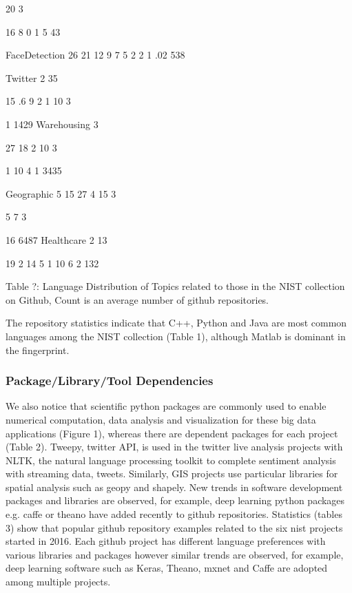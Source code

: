 \documentclass[9pt,twocolumn,twoside]{styles/osajnl}
\begin{document}
	20%
	3%

	16%
	8%
	0%
	1%
	5%
	43

	FaceDetection
	26%
	21%
	12%
	9%
	7%
	5%
	2%
	2%
	1%
	.02%
	538

	Twitter
	2%
	35%

	15%
	.6%
	9%
	2%
	1%
	10%
	3%

	1%
	1429
	Warehousing
	3%

	27%
	18%
	2%
	10%
	3%

	1%
	10%
	4%
	1%
	3435

	Geographic
	5%
	15%
	27%
	4%
	15%
	3%

	5%
	7%
	3%

	16%
	6487
	Healthcare
	2%
	13%

	19%
	2%
	14%
	5%
	1%
	10%
	6%
	2%
	132

	Table ?:  Language Distribution of Topics related to those in the NIST collection on Github, Count is an average number of github repositories.


The repository statistics indicate that C++, Python and Java are most common languages among the NIST collection (Table 1), although Matlab is dominant in the fingerprint. 
\subsubsection{Package/Library/Tool Dependencies}

We also notice that scientific python packages are commonly used to
enable numerical computation, data analysis and visualization for
these big data applications (Figure 1), whereas there are dependent
packages for each project (Table 2). Tweepy, twitter API, is used in
the twitter live analysis projects with NLTK, the natural language
processing toolkit to complete sentiment analysis with streaming data,
tweets. Similarly, GIS projects use particular libraries for spatial
analysis such as geopy and shapely. New trends in software development
packages and libraries are observed, for example, deep learning python
packages e.g. caffe or theano have added recently to github
repositories. Statistics (tables 3) show that popular github
repository examples related to the six nist projects started in
2016. Each github project has different language preferences with
various libraries and packages however similar trends are observed,
for example, deep learning software such as Keras, Theano, mxnet and
Caffe are adopted among multiple projects.



  
\end{document}

